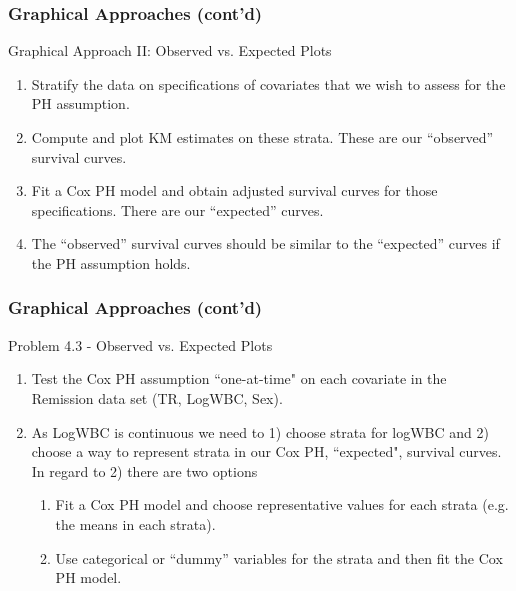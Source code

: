 \documentclass{beamer}
\theoremstyle{definition}
\begin{document}
\begin{frame}
\frametitle{Graphical Approaches (cont'd)}
\begin{block}{Graphical Approach II: Observed vs. Expected Plots}
\begin{enumerate} 
\item Stratify the data on specifications of covariates that we wish to assess for the PH assumption. 
\item Compute and plot KM estimates on these strata. These are our ``observed'' survival curves. 
\item Fit a Cox PH model and obtain adjusted survival curves for those specifications. There are our ``expected'' curves. 
\item The ``observed'' survival curves should be similar to the ``expected'' curves if the PH assumption holds.  
\end{enumerate} 
\end{block}
\end{frame}

\begin{frame}
\frametitle{Graphical Approaches (cont'd)}
\begin{block}{Problem 4.3 - Observed vs. Expected Plots}
\begin{enumerate} 
\item Test the Cox PH assumption ``one-at-time" on each covariate in the Remission data set (TR, LogWBC, Sex). 
\item As LogWBC is continuous we need to 1) choose strata for logWBC and 2) choose a way to represent strata in our Cox PH, ``expected", survival curves. In regard to 2) there are two options
\begin{enumerate}
\item Fit a Cox PH model and choose representative values for each strata (e.g. the means in each strata). 
\item Use categorical or ``dummy'' variables for the strata and then fit the Cox PH model.  
\end{enumerate}
\end{enumerate} 
\end{block}
\end{frame}
\end{document}
